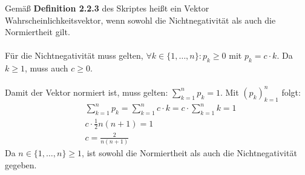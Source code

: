 Gemäß \textbf{Definition 2.2.3} des Skriptes heißt ein Vektor Wahrscheinlichkeitsvektor, wenn sowohl die Nichtnegativität als auch die Normiertheit gilt.\\
\\
Für die Nichtnegativität muss gelten, $\forall k \in \{1,\dots,n\}: p_k \ge 0$ mit $p_k = c \cdot k$. Da $k \ge 1$, muss auch $c\ge 0$.\\
\\
Damit der Vektor normiert ist, muss gelten: $\sum_{k=1}^{n}p_k = 1$. Mit $(p_k)_{k=1}^{n}$ folgt:
\begin{equation*}
	\begin{split}
		&\sum_{k=1}^{n}p_k = \sum_{k=1}^{n} c \cdot k = c \cdot \sum_{k=1}^{n} k = 1\\
		&c \cdot \frac{1}{2}n(n+1) = 1\\
		&c = \frac{2}{n(n+1)}
	\end{split}
\end{equation*}
Da $n\in\{1,\dots,n\} \ge 1$, ist sowohl die Normiertheit als auch die Nichtnegativität gegeben.

